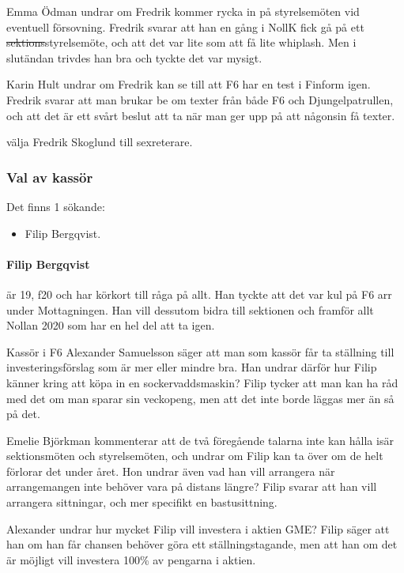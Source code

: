 \documentclass[hidelinks]{sektionsmote}
\begin{document}
Emma Ödman undrar om Fredrik kommer rycka in på styrelsemöten vid eventuell försovning.
Fredrik svarar att han en gång i NollK fick gå på ett \sout{sektions}styrelsemöte, och att det var lite som att få lite whiplash.
Men i slutändan trivdes han bra och tyckte det var mysigt.

Karin Hult undrar om Fredrik kan se till att F6 har en test i Finform igen.
Fredrik svarar att man brukar be om texter från både F6 och Djungelpatrullen, och att det är ett svårt beslut att ta när man ger upp på att någonsin få texter.

\begin{beslut}
  \item välja Fredrik Skoglund till sexreterare.
\end{beslut}

\subsubsection{Val av kassör}
Det finns 1 sökande:
\begin{itemize}
    \item Filip Bergqvist.
\end{itemize}

\paragraph{Filip Bergqvist} är 19, f20 och har körkort till råga på allt.
Han tyckte att det var kul på F6 arr under Mottagningen.
Han vill dessutom bidra till sektionen och framför allt Nollan 2020 som har en hel del att ta igen.

Kassör i F6 Alexander Samuelsson säger att man som kassör får ta ställning till investeringsförslag som är mer eller mindre bra.
Han undrar därför hur Filip känner kring att köpa in en sockervaddsmaskin?
Filip tycker att man kan ha råd med det om man sparar sin veckopeng, men att det inte borde läggas mer än så på det.

Emelie Björkman kommenterar att de två föregående talarna inte kan hålla isär sektionsmöten och styrelsemöten, och undrar om Filip kan ta över om de helt förlorar det under året.
Hon undrar även vad han vill arrangera när arrangemangen inte behöver vara på distans längre?
Filip svarar att han vill arrangera sittningar, och mer specifikt en bastusittning.

Alexander undrar hur mycket Filip vill investera i aktien GME?
Filip säger att han om han får chansen behöver göra ett ställningstagande, men att han om det är möjligt vill investera 100\% av pengarna i aktien.
\end{document}
